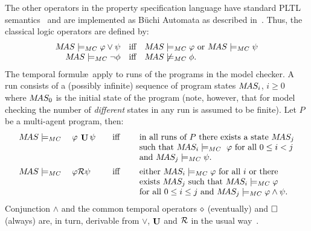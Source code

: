 \noindent The other operators in the \ajpf{} property specification
language have standard PLTL semantics~\cite{emerson:90a} and are
implemented as B\"{u}chi Automata as described
in~\cite{Gerth:1995:SOA:645837.670574,Courcoubetis92mea}. Thus, the
classical logic operators are defined by:
$$
\begin{array}{rcl}
  M\!AS \models_{MC} \varphi \vee \psi &\text{iff}& M\!AS \models_{MC}
  \varphi \text{ or } M\!AS \models_{MC} \psi \\
  M\!AS \models_{MC} \neg \phi &\text{iff}& M\!AS \not\models_{MC} \phi.
\end{array}
$$
The temporal formul\ae\ apply to runs of the programs in the \jpf{}
model checker. A run consists of a (possibly infinite) sequence of
program states $M\!AS_i$, $i \geq 0$ where $M\!AS_0$ is the initial
state of the program (note, however, that for model checking the
number of \emph{different} states in any run is assumed to be
finite). Let $P$ be a multi-agent program, then:
$$
\begin{array}{lcl}
  \MAS \models_{MC}\quad \varphi \: \luntil \psi 
   &\quad\text{iff}\quad&
    \text{ in all runs of $P$ there exists a state } \MAS_j\\
  &&  \text{ such that } \MAS_i \models_{MC}\ \varphi \text{ for all } 0 \leq i < j \\
  && \text{ and } \MAS_j \models_{MC} \psi{}.\\[.5em]
%
  \MAS \models_{MC}\quad\varphi \release \psi  
   &\quad\text{iff}\quad&
    \text{ either } \MAS_i \models_{MC} \varphi \text{ for all } i \text{ or there }\\
  && \text{ exists } \MAS_j \text{ such  that } \MAS_i \models_{MC} \varphi\\
  && \text{ for all } 0 \leq i \leq j \text{ and } \MAS_j \models_{MC} \varphi \land \psi{}.
\end{array}
$$
%
Conjunction $\land$ and the common temporal operators $\diamond$ (eventually) and $\Box$
(always) are, in turn, derivable from $\vee$, $\mathop{\mathrm{\mathbf{U}}}$ and $\mathcal{R}$ in the usual way~\cite{emerson:90a}.

